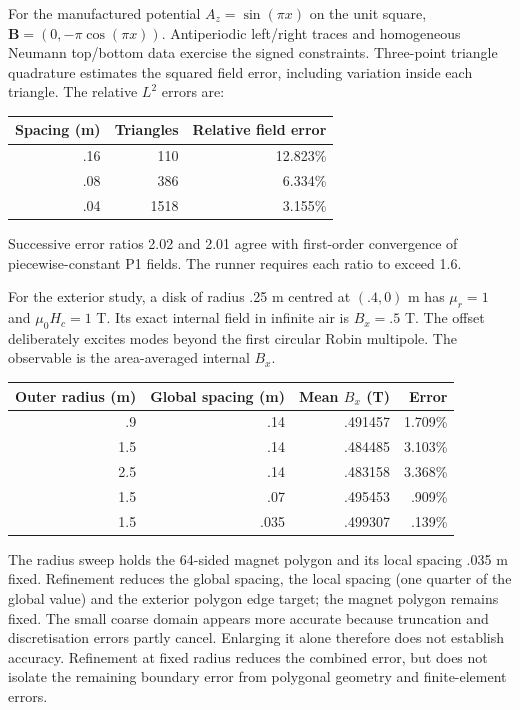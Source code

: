 For the manufactured potential $A_z=\sin(\pi x)$ on the unit square,
$\mathbf B=(0,-\pi\cos(\pi x))$. Antiperiodic left/right traces and homogeneous
Neumann top/bottom data exercise the signed constraints. Three-point triangle
quadrature estimates the squared field error, including variation inside each
triangle. The relative $L^2$ errors are:
\begin{center}
\begin{tabular}{rrr}
\toprule Spacing (m) & Triangles & Relative field error\\
\midrule
.16 & 110 & 12.823\%\\
.08 & 386 & 6.334\%\\
.04 & 1518 & 3.155\%\\
\bottomrule
\end{tabular}
\end{center}
Successive error ratios 2.02 and 2.01 agree with first-order convergence of
piecewise-constant P1 fields. The runner requires each ratio to exceed 1.6.

For the exterior study, a disk of radius .25 m centred at $(.4,0)$ m has
$\mu_r=1$ and $\mu_0H_c=1$ T. Its exact internal field in infinite air is
$B_x=.5$ T. The offset deliberately excites modes beyond the first circular
Robin multipole. The observable is the area-averaged internal $B_x$.
\begin{center}
\begin{tabular}{rrrr}
\toprule Outer radius (m) & Global spacing (m) & Mean $B_x$ (T) & Error\\
\midrule
.9 & .14 & .491457 & 1.709\%\\
1.5 & .14 & .484485 & 3.103\%\\
2.5 & .14 & .483158 & 3.368\%\\
1.5 & .07 & .495453 & .909\%\\
1.5 & .035 & .499307 & .139\%\\
\bottomrule
\end{tabular}
\end{center}
The radius sweep holds the 64-sided magnet polygon and its local spacing
.035 m fixed. Refinement reduces the global spacing, the local spacing
(one quarter of the global value) and the exterior polygon edge target;
the magnet polygon remains fixed. The small coarse domain appears more
accurate because truncation and discretisation errors partly cancel.
Enlarging it alone therefore does not establish accuracy. Refinement at fixed
radius reduces the combined error, but does not isolate the remaining
boundary error from polygonal geometry and finite-element errors.


